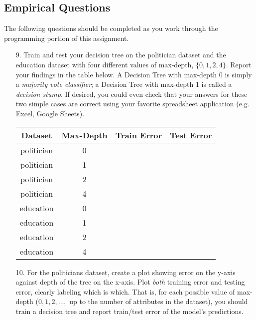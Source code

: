 \subsection{Empirical Questions}
\label{sec:empirical}

The following questions should be completed as you work through the programming portion of this assignment.

 \begin{enumerate}
    \item[9.] Train and test your decision tree on the politician dataset and the education dataset with four different values of max-depth, $\{0,1,2,4\}$. Report your findings in the table below. A Decision Tree with max-depth 0 is simply a \emph{majority vote classifier}; a Decision Tree with max-depth 1 is called a \emph{decision stump}. If desired, you could even check that your answers for these two simple cases are correct using your favorite spreadsheet application (e.g. Excel, Google Sheets).
    
    \begin{center}
    \begin{tabular}{cc|c|c}
        \toprule
      {\bf Dataset}   & {\bf Max-Depth} & {\bf Train Error} & {\bf Test Error} \\
      \midrule
        politician & 0 & & \\
        politician & 1 & & \\
        politician & 2 & & \\
        politician & 4 & & \\
        \midrule
        education & 0 & & \\
        education & 1 & & \\
        education & 2 & & \\
        education & 4 & & \\
        \bottomrule
    \end{tabular}
    \end{center}
    
    \item[10.] For the politicians dataset, create a plot showing error on the y-axis against depth of the tree on the x-axis. Plot \emph{both} training error and testing error, clearly labeling which is which.  That is, for each possible value of max-depth ($0, 1, 2, \ldots,$ up to the number of attributes in the dataset), you should train a decision tree and report train/test error of the model's predictions.
    

    \begin{tcolorbox}[fit,height=5cm,blank, borderline={1pt}{-2pt},nobeforeafter]
    \end{tcolorbox}
    

\end{enumerate}

